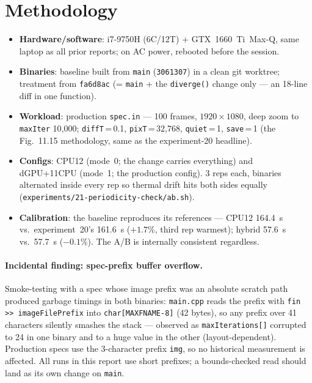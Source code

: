 \documentclass[
	english,
	letterpaper, oneside
]{article}
\begin{document}
\section{Methodology}
\label{sec:method}

\begin{itemize}
  \item \textbf{Hardware/software}: i7-9750H (6C/12T) + GTX~1660~Ti~Max-Q,
        same laptop as all prior reports; on AC power, rebooted before the
        session.
  \item \textbf{Binaries}: baseline built from \texttt{main} (\texttt{3061307})
        in a clean git worktree; treatment from \texttt{fa6d8ac} (=
        \texttt{main} + the \texttt{diverge()} change only --- an 18-line diff
        in one function).
  \item \textbf{Workload}: production \texttt{spec.in} --- 100 frames,
        $1920\times1080$, deep zoom to \texttt{maxIter} 10{,}000;
        \texttt{diffT}\,=\,0.1, \texttt{pixT}\,=\,32{,}768,
        \texttt{quiet}\,=\,1, \texttt{save}\,=\,1 (the Fig.~11.15 methodology,
        same as the experiment-20 headline).
  \item \textbf{Configs}: CPU12 (mode~0; the change carries everything) and
        dGPU+11CPU (mode~1; the production config). 3 reps each,
        binaries alternated inside every rep so thermal drift hits
        both sides equally (\texttt{experiments/21-periodicity-check/ab.sh}).
  \item \textbf{Calibration}: the baseline reproduces its references ---
        CPU12 164.4~s vs.\ experiment~20's 161.6~s ($+1.7\%$, third rep
        warmest); hybrid 57.6~s vs.\ 57.7~s ($-0.1\%$). The A/B is internally
        consistent regardless.
\end{itemize}

\paragraph{Incidental finding: spec-prefix buffer overflow.} Smoke-testing
with a spec whose image prefix was an absolute scratch path produced garbage
timings in both binaries: \texttt{main.cpp} reads the prefix with
\texttt{fin >{}> imageFilePrefix} into \texttt{char[MAXFNAME-8]} (42 bytes),
so any prefix over 41 characters silently smashes the stack --- observed as
\texttt{maxIterations[]} corrupted to 24 in one binary and to a huge value in
the other (layout-dependent). Production specs use the 3-character prefix
\texttt{img}, so no historical measurement is affected. All runs in
this report use short prefixes; a bounds-checked read should land as its own
change on \texttt{main}.
\end{document}
